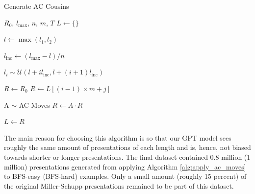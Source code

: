 \begin{algorithm}
	\caption{Generate AC Cousins}\label{alg:apply_ac_moves}
	\begin{algorithmic}
		\Require $R_0$, $l_{\text{max}}$, $n$, $m$, $T$
		\State $L \gets \{ \}$ 

		\State $l \gets \max(l_1, l_2)$


		\State $l_{\text{inc}} \gets (l_{\text{max}}-l)/n$




		\State $l_i \sim \mathcal{U}(l + i l_{\text{inc}} , l + (i+1) l_{\text{inc}})$

		\State $R \gets R_0$
		\Else
		\State $R \gets L[(i-1) \times m+j]$
		\EndIf




		\State A $\sim$ AC Moves
		\State $R \gets A \cdot R$


		\EndFor

		\State $L \gets R$


		\EndFor
		\EndFor

	\end{algorithmic}
\end{algorithm}

The main reason for choosing this algorithm is so that our GPT model sees roughly the same amount of presentations of each length and is, hence, not biased towards shorter or longer presentations. The final dataset contained 0.8 million (1 million) presentations generated from applying Algorithm \autoref{alg:apply_ac_moves} to BFS-easy (BFS-hard) examples. Only a small amount (roughly 15 percent) of the original Miller-Schupp presentations remained to be part of this dataset.

